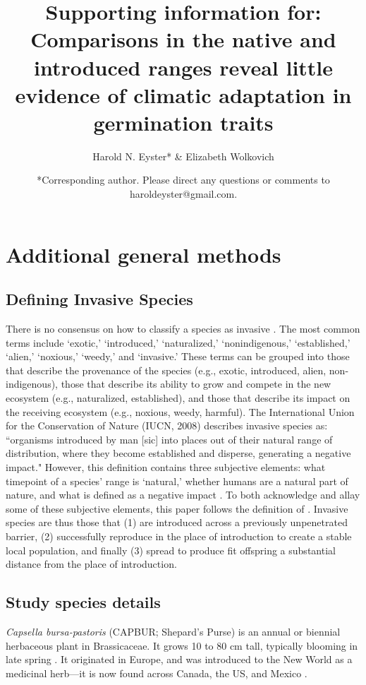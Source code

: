 \documentclass[12pt]{article}\usepackage[]{graphicx}\usepackage[]{color}
\title{\textbf{Supporting information for:}  \\ \bigskip Comparisons in the native and introduced ranges reveal little evidence of climatic adaptation in germination traits}\author{Harold N. Eyster* \&  Elizabeth Wolkovich}
\date{*Corresponding author. Please direct any questions or comments to haroldeyster@gmail.com. }
\begin{document}
\maketitle
\tableofcontents
\section{Additional general methods}
\subsection{Defining Invasive Species}
There is no consensus on how to classify a species as invasive \parencite{Colautti2004}. The most common terms include `exotic,' `introduced,' `naturalized,' `nonindigenous,' `established,' `alien,' `noxious,' `weedy,' and `invasive.' These terms can be grouped into those that describe the provenance of the species (e.g., exotic, introduced, alien, non-indigenous), those that describe its ability to grow and compete in the new ecosystem (e.g., naturalized, established), and those that describe its impact on the receiving ecosystem (e.g., noxious, weedy, harmful). The International Union for the Conservation of Nature (IUCN, 2008) describes invasive species as: ``organisms introduced by man [sic] into places out of their natural range of distribution, where they become established and disperse, generating a negative impact." \nocite{IUCN2008is} However, this definition contains three subjective elements: what timepoint of a species' range is `natural,' whether humans are a natural part of nature, and what is defined as a negative impact \parencite{Munro2019}. To both acknowledge and allay some of these subjective elements, this paper follows the definition of \textcite{Richardson2000,Richardson2011}. Invasive species are thus those that (1) are introduced across a previously unpenetrated barrier, (2) successfully reproduce in the place of introduction to create a stable local population, and finally (3) spread to produce fit offspring a substantial distance from the place of introduction.

\subsection{Study species details}
\textit{Capsella bursa-pastoris} (CAPBUR; Shepard's Purse) is an annual or biennial herbaceous plant in Brassicaceae. It grows 10 to 80 cm tall, typically blooming in late spring \parencite{Defelice2001}. It originated in Europe, and was introduced to the New World as a medicinal herb---it is now found across Canada, the US, and Mexico \parencite{Westrich1989}.
	
\end{document}
